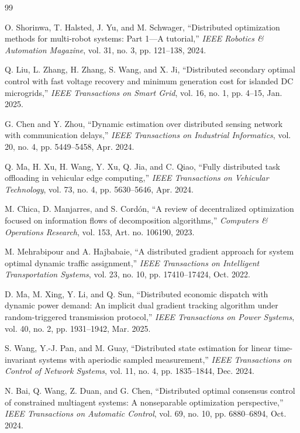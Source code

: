 \documentclass[conference]{IEEEtran}
\begin{document}
\begin{thebibliography}{99}

 O. Shorinwa, T. Halsted, J. Yu, and M. Schwager, ``Distributed optimization methods for multi-robot systems: Part 1---A tutorial,'' \emph{IEEE Robotics \& Automation Magazine}, vol. 31, no. 3, pp. 121--138, 2024.

 Q. Liu, L. Zhang, H. Zhang, S. Wang, and X. Ji, ``Distributed secondary optimal control with fast voltage recovery and minimum generation cost for islanded DC microgrids,'' \emph{IEEE Transactions on Smart Grid}, vol. 16, no. 1, pp. 4--15, Jan. 2025.

 G. Chen and Y. Zhou, ``Dynamic estimation over distributed sensing network with communication delays,'' \emph{IEEE Transactions on Industrial Informatics}, vol. 20, no. 4, pp. 5449--5458, Apr. 2024.

 Q. Ma, H. Xu, H. Wang, Y. Xu, Q. Jia, and C. Qiao, ``Fully distributed task offloading in vehicular edge computing,'' \emph{IEEE Transactions on Vehicular Technology}, vol. 73, no. 4, pp. 5630--5646, Apr. 2024.

 M. Chica, D. Manjarres, and S. Cord\'on, ``A review of decentralized optimization focused on information flows of decomposition algorithms,'' \emph{Computers \& Operations Research}, vol. 153, Art. no. 106190, 2023.

 M. Mehrabipour and A. Hajbabaie, ``A distributed gradient approach for system optimal dynamic traffic assignment,'' \emph{IEEE Transactions on Intelligent Transportation Systems}, vol. 23, no. 10, pp. 17410--17424, Oct. 2022.

 D. Ma, M. Xing, Y. Li, and Q. Sun, ``Distributed economic dispatch with dynamic power demand: An implicit dual gradient tracking algorithm under random-triggered transmission protocol,'' \emph{IEEE Transactions on Power Systems}, vol. 40, no. 2, pp. 1931--1942, Mar. 2025.

 S. Wang, Y.-J. Pan, and M. Guay, ``Distributed state estimation for linear time-invariant systems with aperiodic sampled measurement,'' \emph{IEEE Transactions on Control of Network Systems}, vol. 11, no. 4, pp. 1835--1844, Dec. 2024.

 N. Bai, Q. Wang, Z. Duan, and G. Chen, ``Distributed optimal consensus control of constrained multiagent systems: A nonseparable optimization perspective,'' \emph{IEEE Transactions on Automatic Control}, vol. 69, no. 10, pp. 6880--6894, Oct. 2024.


\end{thebibliography}
\end{document}
